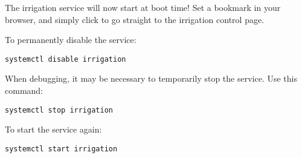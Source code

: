 The irrigation service will now start at boot time!  Set a bookmark in your 
browser, and simply click to go straight to the irrigation control page.

To permanently disable the service:

\begin{verbatim}
systemctl disable irrigation
\end{verbatim}

When debugging, it may be necessary to temporarily stop the service.  Use this 
command:

\begin{verbatim}
systemctl stop irrigation
\end{verbatim}

To start the service again:

\begin{verbatim}
systemctl start irrigation
\end{verbatim}



